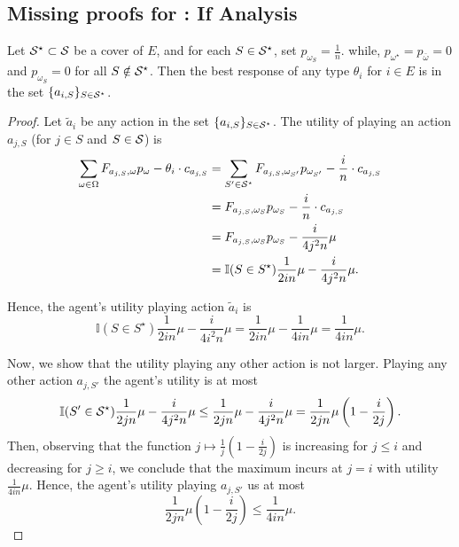\subsection{Missing proofs for : If Analysis}
\begin{lemma}\label{lem:BR_IF}
    Let $\mathcal{S}^\star\subset \mathcal{S}$ be a cover of $E$, and for each $S\in \mathcal{S}^\star$, set $p_{\omega_S}=\frac{1}{n}$.
	while, $p_{\omega^\star}=p_{\bar \omega}=0$ and $p_{\omega_S}=0$ for all $S\notin \mathcal{S}^\star$. Then the best response of any type $\theta_i$ for $i\in E$ is in the set $\{a_{i,S}\}_{S\in\mathcal{S}^\star}$.
\end{lemma}

\begin{proof}
        Let $\tilde a_i$ be any action in the set $\{a_{i,S}\}_{S\in\mathcal{S}^\star}$.
        The utility of playing an action $a_{j, S}$ (for $j\in S$ and $S\in\mathcal{S}$) is
	\begin{align*}
		\sum_{\omega \in \Omega} F_{ a_{j, S}, \omega } p_\omega - \theta_i \cdot c_{a_{j, S}} &= \sum_{S'\in\mathcal{S}^\star} F_{ a_{j, S}, {\omega_{S'}} } p_{\omega_{S'}} - \frac{i}{n} \cdot c_{a_{j, S}}\\
        & = F_{ a_{j, S}, {\omega_{S}} } p_{\omega_{S}} - \frac{i}{n} \cdot c_{a_{j, S}}  \\
        & =  F_{ a_{j, S}, {\omega_{S}} } p_{\omega_{S}} - \frac{i}{4j^2n}\mu  \\
        &= \mathbb{I}(S \in S^\star) \frac{1}{2in}\mu -  \frac{i}{4j^2n}\mu. 
	\end{align*}
 
    Hence, the agent's utility playing action $\tilde a_{i}$ is 
    \[
    \mathbb{I}(S \in S^\star) \frac{1}{2in}\mu-  \frac{i}{4i^2n}\mu = \frac{1}{2in}\mu-  \frac{1}{4in}\mu =   \frac{1}{4in}\mu.
    \]

    Now, we show that the utility playing any other action is not larger.
    Playing any other action $a_{j,S'}$ the agent's utility is at most
    \[
        \mathbb{I}(S' \in \mathcal{S}^\star) \frac{1}{2jn}\mu -  \frac{i}{4j^2n}\mu \le \frac{1}{2jn}\mu -  \frac{i}{4j^2n}\mu=
        \frac{1}{2jn}\mu \left(1-\frac{i}{2j}\right). 
    \]
    Then, observing that the function $j\mapsto \frac{1}{j}(1-\frac{i}{2j})$ is increasing for $j\le i$ and decreasing for $j\ge i$, we conclude that the maximum incurs at $j=i$ with utility $\frac{1}{4in}\mu$.
    Hence, the agent's utility playing $a_{j,S'}$ us at most
    \[ \frac{1}{2jn}\mu \left(1-\frac{i}{2j}\right) \le \frac{1}{4in}\mu. \]
	

\end{proof}
